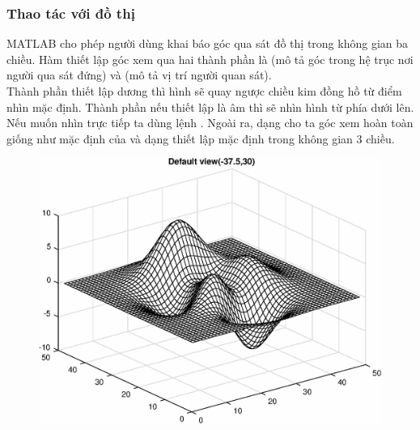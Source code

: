 \documentclass[12pt,a4paper]{article}
\begin{document}
\subsubsection{Thao tác với đồ thị}
MATLAB cho phép người dùng khai báo góc qua sát đồ thị trong không gian ba chiều. Hàm  thiết lập góc xem qua hai thành phần là  (mô tả góc trong hệ trục nơi người qua sát đứng) và  (mô tả vị trí người quan sát).\\
Thành phần  thiết lập dương thì hình sẽ quay ngược chiều kim đồng hồ từ điểm nhìn mặc định. Thành phần  nếu thiết lập là âm thì  sẽ nhìn hình từ phía dưới lên. Nếu muốn nhìn trực tiếp ta dùng lệnh . Ngoài ra, dạng  cho ta góc xem hoàn toàn giống như mặc định của  và dạng  thiết lập mặc định trong không gian 3 chiều.
\begin{center}
	\begin{figure}[H]
	\begin{center}
		\includegraphics[scale=0.6]{hinhtieuluan/dothi19}
	\end{center}
		\caption{}
		\label{refdothi19}
	\end{figure}
\end{center}
\end{document}
